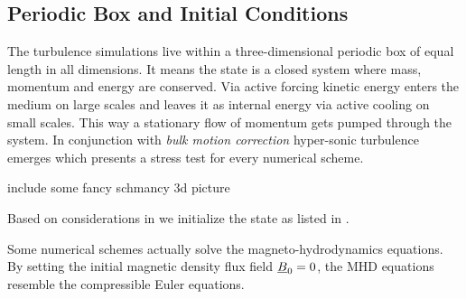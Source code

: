 \subsection{Periodic Box and Initial Conditions}

The turbulence simulations live within a three-dimensional periodic box of
equal length in all dimensions. It means the state is a closed system where
mass, momentum and energy are conserved. Via active forcing kinetic energy
enters the medium on large scales and leaves it as internal energy via active
cooling on small scales. This way a stationary flow of momentum gets pumped
through the system. In conjunction with \emph{bulk motion correction}
hyper-sonic turbulence emerges which presents a stress test for every numerical
scheme.

include some fancy schmancy 3d picture 

Based on considerations in  we initialize the state
as listed in . 


\remark Some numerical schemes actually solve the magneto-hydrodynamics
equations. By setting the initial magnetic density flux field $\underline{B}_0 = 0$,
the MHD equations resemble the compressible Euler equations.
